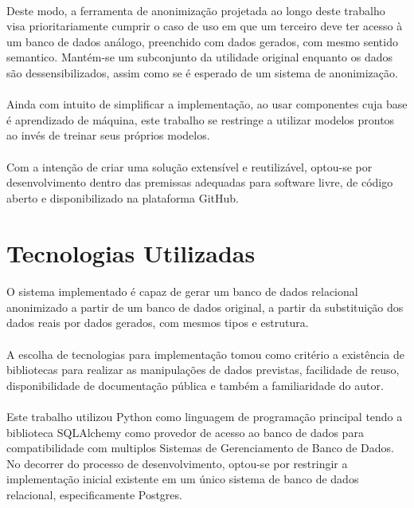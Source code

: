 \paragraph{} Deste modo, a ferramenta de anonimização projetada ao longo deste trabalho visa prioritariamente cumprir o caso de uso em que um terceiro deve ter acesso à um banco de dados análogo, preenchido com dados gerados, com mesmo sentido semantico. Mantém-se um subconjunto da utilidade original enquanto os dados são dessensibilizados, assim como se é esperado de um sistema de anonimização.

\paragraph{} Ainda com intuito de simplificar a implementação, ao usar componentes cuja base é aprendizado de máquina, este trabalho se restringe a utilizar modelos prontos ao invés de treinar seus próprios modelos.

\paragraph{} Com a intenção de criar uma solução extensível e reutilizável, optou-se por desenvolvimento dentro das premissas adequadas para software livre, de código aberto e disponibilizado na plataforma GitHub.

\section{Tecnologias Utilizadas}

\paragraph{} O sistema implementado é capaz de gerar um banco de dados relacional anonimizado a partir de um banco de dados original, a partir da substituição dos dados reais por dados gerados, com mesmos tipos e estrutura.

\paragraph{} A escolha de tecnologias para implementação tomou como critério a existência de bibliotecas para realizar as manipulações de dados previstas, facilidade de reuso, disponibilidade de documentação pública e também a familiaridade do autor.

\paragraph{} Este trabalho utilizou Python como linguagem de programação principal tendo a biblioteca SQLAlchemy como provedor de acesso ao banco de dados para compatibilidade com multiplos Sistemas de Gerenciamento de Banco de Dados. No decorrer do processo de desenvolvimento, optou-se por restringir a implementação inicial existente em um único sistema de banco de dados relacional, especificamente Postgres.

